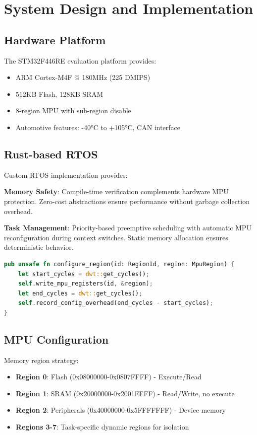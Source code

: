 \chapter{System Design and Implementation}
\label{sec:system-design}

\section{Hardware Platform}

The STM32F446RE evaluation platform provides:
\begin{itemize}
    \item ARM Cortex-M4F @ 180MHz (225 DMIPS)
    \item 512KB Flash, 128KB SRAM
    \item 8-region MPU with sub-region disable
    \item Automotive features: -40°C to +105°C, CAN interface
\end{itemize}

\section{Rust-based RTOS}

Custom RTOS implementation provides:

\textbf{Memory Safety}: Compile-time verification complements hardware MPU protection. Zero-cost abstractions ensure performance without garbage collection overhead.

\textbf{Task Management}: Priority-based preemptive scheduling with automatic MPU reconfiguration during context switches. Static memory allocation ensures deterministic behavior.

\begin{lstlisting}[language=Rust, caption=MPU Configuration Interface, basicstyle=\tiny\ttfamily]
pub unsafe fn configure_region(id: RegionId, region: MpuRegion) {
    let start_cycles = dwt::get_cycles();
    self.write_mpu_registers(id, &region);
    let end_cycles = dwt::get_cycles();
    self.record_config_overhead(end_cycles - start_cycles);
}
\end{lstlisting}

\section{MPU Configuration}

Memory region strategy:
\begin{itemize}
    \item \textbf{Region 0}: Flash (0x08000000-0x0807FFFF) - Execute/Read
    \item \textbf{Region 1}: SRAM (0x20000000-0x2001FFFF) - Read/Write, no execute
    \item \textbf{Region 2}: Peripherals (0x40000000-0x5FFFFFFF) - Device memory
    \item \textbf{Regions 3-7}: Task-specific dynamic regions for isolation
\end{itemize}

